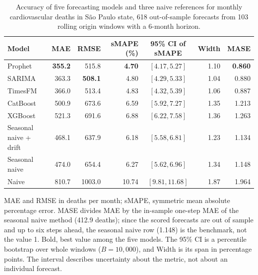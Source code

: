 \begin{table}[htbp]
\centering
\small
\setlength{\tabcolsep}{5pt}
\caption{Accuracy of five forecasting models and three naive references for monthly cardiovascular deaths in S\~ao Paulo state, 618 out-of-sample forecasts from 103 rolling origin windows with a 6-month horizon.}
\label{tab:desempenho}
\begin{tabular}{lrrrcrr}
\toprule
Model & MAE & RMSE & sMAPE (\%) & 95\% CI of sMAPE & Width & MASE \\
\midrule
Prophet & \textbf{355.2} & 515.8 & \textbf{4.70} & $[4.17, 5.27]$ & 1.10 & \textbf{0.860} \\
SARIMA & 363.3 & \textbf{508.1} & 4.80 & $[4.29, 5.33]$ & 1.04 & 0.880 \\
TimesFM & 366.0 & 513.4 & 4.83 & $[4.32, 5.39]$ & 1.06 & 0.887 \\
CatBoost & 500.9 & 673.6 & 6.59 & $[5.92, 7.27]$ & 1.35 & 1.213 \\
XGBoost & 521.3 & 691.6 & 6.88 & $[6.22, 7.58]$ & 1.36 & 1.263 \\
\midrule
Seasonal naive + drift & 468.1 & 637.9 & 6.18 & $[5.58, 6.81]$ & 1.23 & 1.134 \\
Seasonal naive & 474.0 & 654.4 & 6.27 & $[5.62, 6.96]$ & 1.34 & 1.148 \\
Naive & 810.7 & 1003.0 & 10.74 & $[9.81, 11.68]$ & 1.87 & 1.964 \\
\bottomrule
\end{tabular}

\vspace{0.5em}
\begin{minipage}{\textwidth}
\footnotesize
MAE and RMSE in deaths per month; sMAPE, symmetric mean absolute percentage error. MASE divides MAE by the in-sample one-step MAE of the seasonal naive method (412.9 deaths); since the scored forecasts are out of sample and up to six steps ahead, the seasonal naive row (1.148) is the benchmark, not the value 1. Bold, best value among the five models. The 95\% CI is a percentile bootstrap over whole windows ($B=10{,}000$), and Width is its span in percentage points. The interval describes uncertainty about the metric, not about an individual forecast.
\end{minipage}
\end{table}
